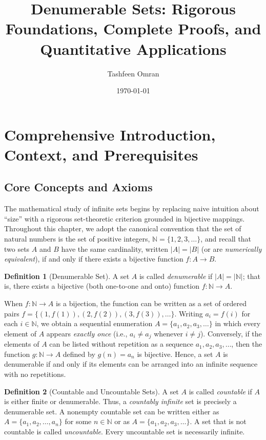\documentclass[11pt, letterpaper]{article}
\title{\textbf{Denumerable Sets: Rigorous Foundations, Complete Proofs, and Quantitative Applications}}
\author{Tashfeen Omran}
\date{\today}
\theoremstyle{definition}
\newtheorem{definition}{Definition}[section]
\theoremstyle{remark}
\begin{document}
\maketitle
\tableofcontents
\newpage

\section{Comprehensive Introduction, Context, and Prerequisites}

\subsection{Core Concepts and Axioms}

The mathematical study of infinite sets begins by replacing naive intuition about ``size'' with a rigorous set-theoretic criterion grounded in bijective mappings. Throughout this chapter, we adopt the canonical convention that the set of natural numbers is the set of positive integers, $\mathbb{N} = \{1, 2, 3, \dots\}$, and recall that two sets $A$ and $B$ have the same cardinality, written $|A| = |B|$ (or are \emph{numerically equivalent}), if and only if there exists a bijective function $f : A \to B$.

\begin{definition}[Denumerable Set]
A set $A$ is called \emph{denumerable} if $|A| = |\mathbb{N}|$; that is, there exists a bijective (both one-to-one and onto) function $f : \mathbb{N} \to A$.
\end{definition}

When $f : \mathbb{N} \to A$ is a bijection, the function can be written as a set of ordered pairs $f = \{(1, f(1)), (2, f(2)), (3, f(3)), \dots\}$. Writing $a_i = f(i)$ for each $i \in \mathbb{N}$, we obtain a sequential enumeration $A = \{a_1, a_2, a_3, \dots\}$ in which every element of $A$ appears \emph{exactly once} (i.e., $a_i \neq a_j$ whenever $i \neq j$). Conversely, if the elements of $A$ can be listed without repetition as a sequence $a_1, a_2, a_3, \dots$, then the function $g : \mathbb{N} \to A$ defined by $g(n) = a_n$ is bijective. Hence, a set $A$ is denumerable if and only if its elements can be arranged into an infinite sequence with no repetitions.

\begin{definition}[Countable and Uncountable Sets]
A set $A$ is called \emph{countable} if $A$ is either finite or denumerable. Thus, a \emph{countably infinite} set is precisely a denumerable set. A nonempty countable set can be written either as $A = \{a_1, a_2, \dots, a_n\}$ for some $n \in \mathbb{N}$ or as $A = \{a_1, a_2, a_3, \dots\}$. A set that is not countable is called \emph{uncountable}. Every uncountable set is necessarily infinite.
\end{definition}
\end{document}
